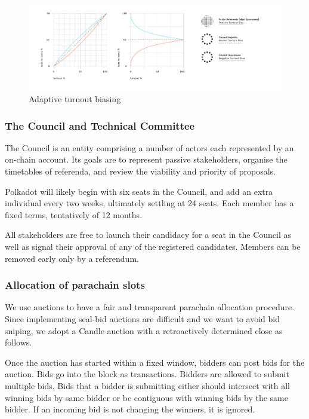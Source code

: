 \begin{figure}[h!]
  \centering
  \includegraphics[width=1.1\textwidth]{images/Turnout-Bias.png}
  \caption{Adaptive turnout biasing}
    \label{fig:biasing}
\end{figure}

\subsubsection{The Council and Technical Committee}\label{s:council}

The Council is an entity comprising a number of actors each represented by an on-chain account. Its goals are to represent passive stakeholders, organise the timetables of referenda, and review the viability and priority of proposals.

Polkadot will likely begin with six seats in the Council, and add an extra individual every two weeks, ultimately settling at 24 seats. Each member has a fixed terms, tentatively of 12 months. 

 All stakeholders are free to launch their candidacy for a seat in the Council as well as signal their approval of any of the registered candidates. Members can be removed early only by a referendum.

\subsubsection{Allocation of parachain slots}\label{s:pAllocation}

We use auctions to have a fair and transparent parachain allocation procedure.
Since implementing seal-bid auctions are difficult and we want to avoid bid sniping, we adopt a Candle auction \cite{Fuellbrunn:2012:CandleAuction} with a retroactively determined close as follows.

Once the auction has started within a fixed window, bidders can post bids for the auction.
Bids go into the block as transactions.
Bidders are allowed to submit multiple bids.
Bids that a bidder is submitting either should intersect with all winning bids by same bidder or be contiguous with winning bids by the same bidder.
If an incoming bid is not changing the winners, it is ignored.

